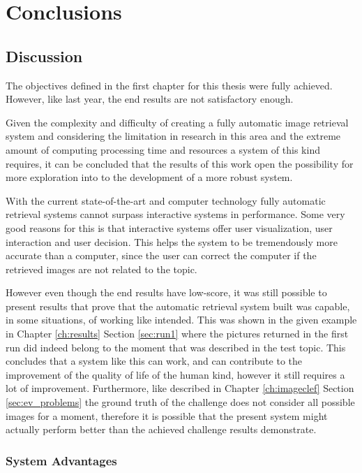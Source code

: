 \cleardoublepage
\chapter{Conclusions}
\label{ch:conclusions}


\section{Discussion}

The objectives defined in the first chapter for this thesis were fully achieved. However, like last year, the end results are not satisfactory enough.


Given the complexity and difficulty of creating a fully automatic image retrieval system and considering the limitation in research in this area and the extreme amount of computing processing time and resources a system of this kind requires, it can be concluded that the results of this work open the possibility for more exploration into to the development of a more robust system.


With the current state-of-the-art and computer technology fully automatic retrieval systems cannot surpass interactive systems in performance. Some very good reasons for this is that interactive systems offer user visualization, user interaction and user decision. This helps the system to be tremendously more accurate than a computer, since the user can correct the computer if the retrieved images are not related to the topic.


However even though the end results have low-score, it was still possible to present results that prove that the automatic retrieval system built was capable, in some situations, of working like intended. This was shown in the given example in Chapter \ref{ch:results} Section \ref{sec:run1} where the pictures returned in the first run did indeed belong to the moment that was described in the test topic. This concludes that a system like this can work, and can contribute to the improvement of the quality of life of the human kind, however it still requires a lot of improvement. Furthermore, like described in Chapter \ref{ch:imageclef} Section \ref{sec:ev_problems} the ground truth of the challenge does not consider all possible images for a moment, therefore it is possible that the present system might actually perform better than the achieved challenge results demonstrate.



\subsection{System Advantages}

